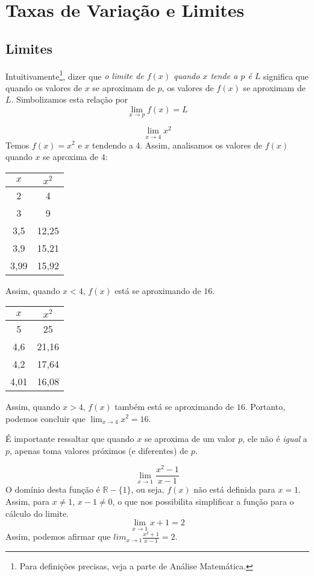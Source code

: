 \chapter{Taxas de Variação e Limites}
\section{Limites}
Intuitivamente\footnote{Para definições precisas, veja a parte de Análise Matemática.}, dizer que \emph{o limite de $f(x)$ quando $x$ tende a $p$ é $L$} significa que quando os valores de $x$ se aproximam de $p$, os valores de $f(x)$ se aproximam de $L$. Simbolizamos esta relação por
\[\displaystyle\lim_{x \rightarrow p} f(x)=L\]
\begin{exemplo}
\[\displaystyle\lim_{x\rightarrow 4}x^2\]
Temos $f(x)=x^2$ e $x$ tendendo a $4$. Assim, analisamos os valores de $f(x)$ quando $x$ se aproxima de $4$:
\begin{table}[H]
\centering
\begin{tabular}{c|c}
$x$  & $x^2$ \\ \hline
2    & 4     \\
3    & 9     \\
3,5  & 12,25 \\
3,9  & 15,21 \\
3,99 & 15,92
\end{tabular}
\end{table}
Assim, quando $x<4$, $f(x)$ está se aproximando de $16$.
\begin{table}[H]
\centering
\begin{tabular}{c|c}
$x$  & $x^2$ \\ \hline
5    & 25    \\
4,6  & 21,16 \\
4,2  & 17,64 \\
4,01 & 16,08
\end{tabular}
\end{table}
Assim, quando $x>4$, $f(x)$ também está se aproximando de $16$. Portanto, podemos concluir que $\lim_{x \rightarrow 4}x^2=16$.
\end{exemplo}
É importante ressaltar que quando $x$ se aproxima de um valor $p$, ele não é \emph{igual} a $p$, apenas toma valores próximos (e diferentes) de $p$. \par 
\begin{exemplo}
\[\displaystyle\lim_{x\rightarrow 1}\dfrac{x^2-1}{x-1}\]
O domínio desta função é $\mathbb{R}-\{1\}$, ou seja, $f(x)$ não está definida para $x=1$. Assim, para $x\neq1$, $x-1\neq 0$, o que nos possibilita simplificar a função para o cálculo do limite.
\[\displaystyle\lim_{x\rightarrow 1}x+1=2\]
Assim, podemos afirmar que $lim_{x\rightarrow 1}\frac{x^2+1}{x-1}=2$.
\end{exemplo}

